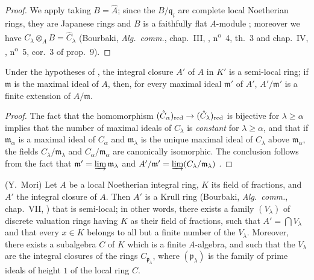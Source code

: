 \begin{proof}
We apply  taking $B=\hat{A}$; since the $B/\mathfrak{q}_i$ are complete local Noetherian rings, they are Japanese rings  and $B$ is a faithfully flat $A$-module ; moreover we have $C_\lambda\otimes_A B=\hat{C}_\lambda$ (Bourbaki, \emph{Alg.~comm.}, chap.~III, , n\textsuperscript{o}~4, th.~3 and chap.~IV, , n\textsuperscript{o}~5, cor.~3 of prop.~9).
\end{proof}

\begin{corollary}[23.2.6]
\label{0.23.2.6}
Under the hypotheses of , the integral closure $A'$ of $A$ in $K'$ is a semi-local ring; if $\mathfrak{m}$ is the maximal ideal of $A$, then, for every maximal ideal $\mathfrak{m}'$ of $A'$, $A'/\mathfrak{m}'$ is a finite extension of $A/\mathfrak{m}$.
\end{corollary}

\begin{proof}
The fact that the homomorphism $(\hat{C}_\alpha)_{\mathrm{red}}\to(\hat{C}_\lambda)_{\mathrm{red}}$ is bijective for $\lambda\geq\alpha$ implies that the number of maximal ideals of $C_\lambda$ is \emph{constant} for $\lambda\geq\alpha$, and that if $\mathfrak{m}_\alpha$ is a maximal ideal of $C_\alpha$ and $\mathfrak{m}_\lambda$ is the unique maximal ideal of $C_\lambda$ above $\mathfrak{m}_\alpha$, the fields $C_\lambda/\mathfrak{m}_\lambda$ and $C_\alpha/\mathfrak{m}_\alpha$ are canonically isomorphic.
The conclusion follows from the fact that $\mathfrak{m}'=\varinjlim\mathfrak{m}_\lambda$ and $A'/\mathfrak{m}'=\varinjlim(C_\lambda/\mathfrak{m}_\lambda)$ .
\end{proof}

\begin{proposition}[23.2.7]
\label{0.23.2.7}
\textnormal{(Y.~Mori)}
Let $A$ be a local Noetherian integral ring, $K$ its field of fractions, and $A'$ the integral closure of $A$.
Then $A'$ is a Krull ring \textnormal{(Bourbaki, \emph{Alg.~comm.}, chap.~VII, )} that is semi-local; in other words, there exists a family $(V_\lambda)$ of discrete valuation rings having $K$ as their field of fractions, such that $A'=\bigcap V_\lambda$ and that every $x\in K$ belongs to all but a finite number of the $V_\lambda$.
Moreover, there exists a subalgebra $C$ of $K$ which is a finite $A$-algebra, and such that the $V_\lambda$ are the integral closures of the rings $C_{\mathfrak{p}_\lambda}$, where $(\mathfrak{p}_\lambda)$ is the family of prime ideals of height $1$ of the local ring $C$.
\end{proposition}

